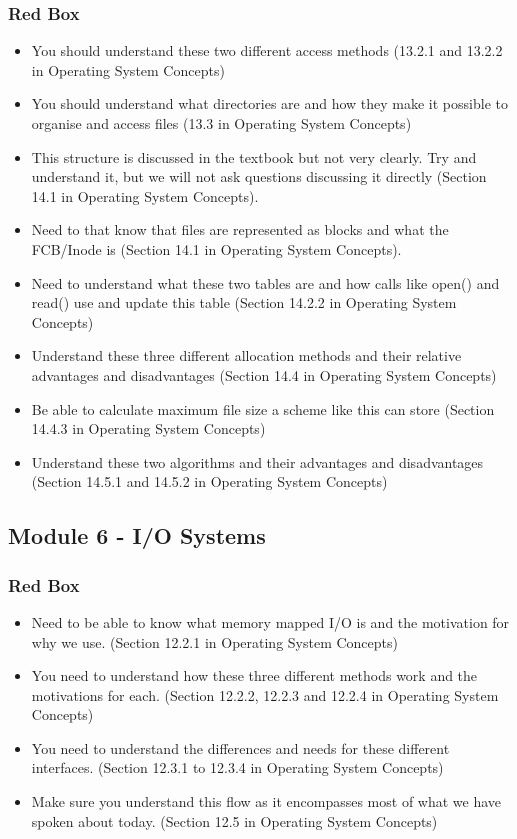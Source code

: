 \documentclass{article}
\begin{document}
\subsubsection{Red Box}
\begin{itemize}
    \item You should understand these two different access methods (13.2.1 and 13.2.2 in Operating System Concepts)
    \item You should understand what directories are and how they make it possible to organise and access files (13.3 in
    Operating System Concepts)
    \item This structure is discussed in the textbook but not very clearly. Try and understand it, but we will not ask
    questions discussing it directly (Section 14.1 in Operating System Concepts).
    \item Need to that know that files are represented as blocks and what the FCB/Inode is (Section 14.1 in Operating
    System Concepts).
    \item Need to understand what these two tables are and how calls like open() and read() use and update this table
    (Section 14.2.2 in Operating System Concepts)
    \item Understand these three different allocation methods and their relative advantages and disadvantages (Section
    14.4 in Operating System Concepts)
    \item Be able to calculate maximum file size a scheme like this can store (Section 14.4.3 in Operating System Concepts)
    \item Understand these two algorithms and their advantages and disadvantages (Section 14.5.1 and 14.5.2 in
    Operating System Concepts)
\end{itemize}


\subsection{Module 6 - I/O Systems}
\subsubsection{Red Box}
\begin{itemize}
    \item Need to be able to know what memory mapped I/O is and the motivation for why we use. (Section 12.2.1 in
    Operating System Concepts)
    \item You need to understand how these three different methods work and the motivations for each. (Section 12.2.2,
    12.2.3 and 12.2.4 in Operating System Concepts)
    \item You need to understand the differences and needs for these different interfaces. (Section 12.3.1 to 12.3.4 in
    Operating System Concepts)
    \item Make sure you understand this flow as it encompasses most of what we have spoken about today. (Section 12.5
    in Operating System Concepts)
\end{itemize}
\end{document}
